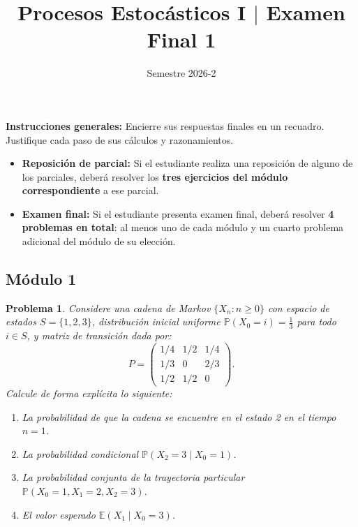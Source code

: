 \documentclass[12pt]{article}
\title{Procesos Estocásticos I $|$ Examen Final 1}
\author{Semestre 2026-2}
\date{}
\newtheorem{problem}{Problema}
\begin{document}
\maketitle
\vspace{-0.8cm}
\scriptsize

\textbf{Instrucciones generales:} Encierre sus respuestas finales en un recuadro. Justifique cada paso de sus cálculos y razonamientos.

\begin{itemize}
    \item \textbf{Reposición de parcial:} Si el estudiante realiza una reposición de alguno de los parciales, deberá resolver los \textbf{tres ejercicios del módulo correspondiente} a ese parcial.
    \item \textbf{Examen final:} Si el estudiante presenta examen final, deberá resolver \textbf{4 problemas en total}: al menos uno de cada módulo y un cuarto problema adicional del módulo de su elección.
\end{itemize}


\subsection*{Módulo 1}

\begin{problem}
Considere una cadena de Markov $\{X_n : n \geq 0\}$ con espacio de estados $S = \{1, 2, 3\}$, distribución inicial uniforme $\mathbb{P}(X_0 = i) = \tfrac{1}{3}$ para todo $i \in S$, y matriz de transición dada por:
\[
P = \begin{pmatrix}
1/4 & 1/2 & 1/4 \\[4pt]
1/3 & 0   & 2/3 \\[4pt]
1/2 & 1/2 & 0
\end{pmatrix}.
\]
Calcule de forma explícita lo siguiente:
\begin{enumerate}
    \item[(a)] La probabilidad de que la cadena se encuentre en el estado 2 en el tiempo $n = 1$.
    \item[(b)] La probabilidad condicional $\mathbb{P}(X_2 = 3 \mid X_0 = 1)$.
    \item[(c)] La probabilidad conjunta de la trayectoria particular $\mathbb{P}(X_0 = 1, X_1 = 2, X_2 = 3)$.
    \item[(d)] El valor esperado $\mathbb{E}(X_1 \mid X_0 = 3)$.
\end{enumerate}
\end{problem}
\end{document}
